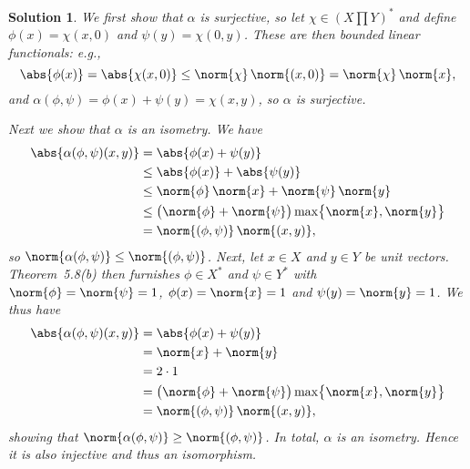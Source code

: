 \documentclass[article, a4paper, 11pt, oneside]{memoir}
\numberwithin{equation}{chapter}
\theoremstyle{nonumberplain}
\newtheorem{solution}{Solution}
\begin{document}
\begin{solution}
	We first show that $\alpha$ is surjective, so let $\chi \in (X \prod Y)^*$ and define $\phi(x) = \chi(x,0)$ and $\psi(y) = \chi(0,y)$. These are then bounded linear functionals: e.g.,
	\begin{equation*}
		\abs{ \phi(x) }
			= \abs{ \chi(x,0) }
			\leq \norm{\chi} \, \norm{(x,0)}
			= \norm{\chi} \, \norm{x},
	\end{equation*}
	and $\alpha(\phi,\psi) = \phi(x) + \psi(y) = \chi(x,y)$, so $\alpha$ is surjective.

	Next we show that $\alpha$ is an isometry. We have
	\begin{align*}
		\abs{ \alpha(\phi,\psi)(x,y) }
			&= \abs{ \phi(x) + \psi(y) } \\
			&\leq \abs{\phi(x)} + \abs{\psi(y)} \\
			&\leq \norm{\phi} \, \norm{x} + \norm{\psi} \, \norm{y} \\
			&\leq \bigl( \norm{\phi} + \norm{\psi} \bigr) \max \bigl\{ \norm{x}, \norm{y} \bigr\} \\
			&= \norm{(\phi,\psi)} \, \norm{(x,y)},
	\end{align*}
	so $\norm{\alpha(\phi,\psi)} \leq \norm{(\phi,\psi)}$. Next, let $x \in X$ and $y \in Y$ be unit vectors. Theorem~5.8(b) then furnishes $\phi \in X^*$ and $\psi \in Y^*$ with $\norm{\phi} = \norm{\psi} = 1$, $\phi(x) = \norm{x} = 1$ and $\psi(y) = \norm{y} = 1$. We thus have
	\begin{align*}
		\abs{ \alpha(\phi,\psi)(x,y) }
			&= \abs{ \phi(x) + \psi(y) } \\
			&= \norm{x} + \norm{y} \\
			&= 2 \cdot 1 \\
			&= \bigl( \norm{\phi} + \norm{\psi} \bigr) \max \bigl\{ \norm{x}, \norm{y} \bigr\} \\
			&= \norm{(\phi,\psi)} \, \norm{(x,y)},
	\end{align*}
	showing that $\norm{\alpha(\phi,\psi)} \geq \norm{(\phi,\psi)}$. In total, $\alpha$ is an isometry. Hence it is also injective and thus an isomorphism.
\end{solution}
\end{document}
